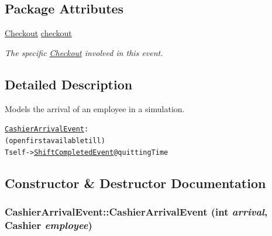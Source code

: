 \subsection*{Package Attributes}
\begin{CompactItemize}
\item 
\hypertarget{class_cashier_arrival_event_1e9f0f9026b3989b092e9d026c910f16}{
\hyperlink{class_checkout}{Checkout} \hyperlink{class_cashier_arrival_event_1e9f0f9026b3989b092e9d026c910f16}{checkout}}
\label{class_cashier_arrival_event_1e9f0f9026b3989b092e9d026c910f16}

\begin{CompactList}\small\item\em The specific \hyperlink{class_checkout}{Checkout} involved in this event. \item\end{CompactList}\end{CompactItemize}


\subsection{Detailed Description}
Models the arrival of an employee in a simulation. 

\small\begin{alltt}
 \hyperlink{class_cashier_arrival_event}{CashierArrivalEvent}: 
   (open first available till)
   T self -> \hyperlink{class_shift_completed_event}{ShiftCompletedEvent} @ quittingTime
 \end{alltt}
\normalsize 
 

\subsection{Constructor \& Destructor Documentation}
\hypertarget{class_cashier_arrival_event_8fac3e34862ebd8334291f43d2e2125c}{
\subsubsection[{CashierArrivalEvent}]{\setlength{\rightskip}{0pt plus 5cm}CashierArrivalEvent::CashierArrivalEvent (int {\em arrival}, \/  {\bf Cashier} {\em employee})}}
\label{class_cashier_arrival_event_8fac3e34862ebd8334291f43d2e2125c}


